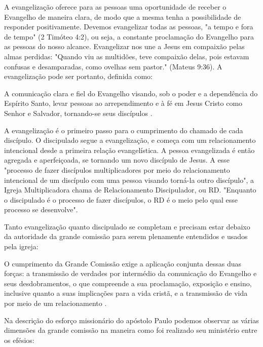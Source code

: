 \documentclass[12pt,openright,oneside,a4paper,
english,french,spanish,brazil]{abntex2}
\begin{document}
A evangelização oferece para as pessoas uma oportunidade de receber o Evangelho de maneira clara, de modo que a mesma tenha a possibilidade de responder positivamente. Devemos evangelizar todas as pessoas, "a tempo e fora de tempo" (2 Timóteo 4:2), ou seja, a constante proclamação do Evangelho para as pessoas do nosso alcance. Evangelizar nos une a Jesus em compaixão pelas almas perdidas: "Quando viu as multidões, teve compaixão delas, pois estavam confusas e desamparadas, como ovelhas sem pastor." (Mateus 9:36). A evangelização pode ser portanto, definida como: 

\begin{citacao}A comunicação clara e fiel do Evangelho visando, sob o poder e a dependência do Espírito Santo, levar pessoas ao arrependimento e à fé em Jesus Cristo como Senhor e Salvador, tornando-se seus discípulos \cite[p. 57]{brandao}.\end{citacao}

A evangelização é o primeiro passo para o cumprimento do chamado de cada discípulo. O discipulado segue a evangelização, e começa com um relacionamento intencional desde a primeira relação evangelística. A pessoa evangelizada é então agregada e aperfeiçoada, se tornando um novo discípulo de Jesus. A esse "processo de fazer discípulos multiplicadores por meio do relacionamento intencional de um discípulo com uma pessoa visando torná-la outro discípulo"\cite[p. 64]{brandao}, a Igreja Multiplicadora chama de Relacionamento Discipulador, ou RD. "Enquanto o discipulado é o processo de fazer discípulos, o RD é o meio pelo qual esse processo se desenvolve"\cite[p. 64]{brandao}.

Tanto evangelização quanto discipulado se completam e precisam estar debaixo da autoridade da grande comissão para serem plenamente entendidos e usados pela igreja:

\begin{citacao}O cumprimento da Grande Comissão exige a aplicação conjunta dessas duas forças: a transmissão de verdades por intermédio da comunicação do Evangelho e seus desdobramentos, o que compreende a sua proclamação, exposição e ensino, inclusive quanto a suas implicações para a vida cristã, e a transmissão de	vida por meio de um relacionamento \cite[p. 66]{brandao}.\end{citacao} 

Na descrição do esforço missionário do apóstolo Paulo podemos observar as várias dimensões da grande comissão na maneira como foi realizado seu ministério entre os efésios:
\end{document}
